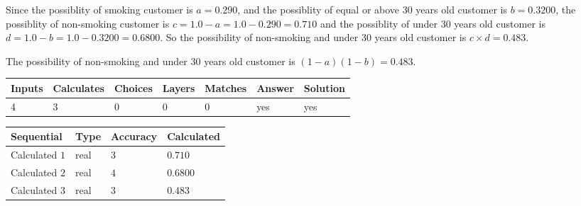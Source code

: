 \documentclass[12pt]{article}
\begin{document}
 
 
\noindent{}
 
 

Since the possiblity of  %
smoking customer is $ a =  %
0.290 $,
and the possiblity of  %
equal or above 30 years old customer is $ b =  %
0.3200 $,
the possiblity of  %
non-smoking customer is $ c = 1.0 - a = 1.0 -
0.290
=  %
0.710 $ and the possiblity of  %
under 30 years old
customer is $ d = 1.0 - b = 1.0 -  %
0.3200 =  %
0.6800  $.
So the possibility of  %
 non-smoking and  %
under 30 years old
customer is $ c \times d =  %
0.483 $.
 
 
 
\noindent{}
 
 

 
 
 
\noindent{}
 
 

The possibility of  %
 non-smoking and  %
under 30 years old
customer is $ (1-a)(1-b) =  %
0.483 $.
 
 
\noindent{}
 
 

 
\vspace{0.3in}
   
   
   
   
\noindent\begin{tabular}{|l|l|l|l|l|l|l|}
 \hline
Inputs & Calculates & Choices & Layers & Matches & Answer & Solution \\ \hline
           4  & 
           3  & 
           0
  & 
           0  & 
           0  & 
  yes & 
  yes 
  \\ \hline
 \end{tabular}
   
   
   
   
\noindent{}
   
   
  
  
\noindent\begin{tabular}{|l|l|l|l|}
\hline
 Sequential & Type & Accuracy & Calculated \\ 
\hline
 
 
  Calculated $            1 $ & real & $            3  $ & 
 $ 0.710 $ 
 \\  \hline  
 
 
  Calculated $            2 $ & real & $            4  $ & 
 $ 0.6800 $ 
 \\  \hline  
 
 
  Calculated $            3 $ & real & $            3  $ & 
 $ 0.483 $ 
 \\  \hline  
 \end{tabular}
   
\end{document}
